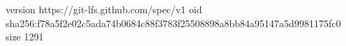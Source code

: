 version https://git-lfs.github.com/spec/v1
oid sha256:f78a5f2e02c5ada74b0684c88f3783f25508898a8bb84a95147a5d9981175fc0
size 1291
